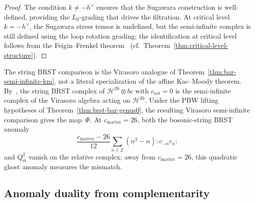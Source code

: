 \begin{proof}
The condition $k \neq -h^\vee$ ensures that the Sugawara
construction is well-defined, providing the $L_0$-grading
that drives the filtration. At critical level
$k = -h^\vee$, the Sugawara stress tensor is undefined, but the
semi-infinite complex is still defined using the loop rotation
grading; the identification at critical level follows from the
Feigin--Frenkel theorem~\cite{Feigin-Frenkel}
(cf.\ Theorem~\ref{thm:critical-level-structure}).
\end{proof}

\begin{remark}
\label{rem:string-brst-special-case}
The string BRST comparison is the Virasoro analogue of
Theorem~\ref{thm:bar-semi-infinite-km}, not a literal specialization
of the affine Kac--Moody theorem. By~\cite{FGZ86}, the string BRST
complex of $\mathcal{H}^{26}\otimes bc$ with $c_{\mathrm{tot}}=0$ is
the semi-infinite complex of the Virasoro algebra acting on
$\mathcal{H}^{26}$. Under the PBW lifting hypotheses of
Theorem~\ref{thm:brst-bar-genus0}, the resulting Virasoro
semi-infinite comparison gives the map~$\Phi$. At
$c_{\mathrm{matter}}=26$, both the bosonic-string BRST anomaly
\[
\frac{c_{\mathrm{matter}}-26}{12}
\sum_{n\in\mathbb Z}(n^3-n){:}c_{-n}c_n{:}
\]
and $Q_{\mathrm{si}}^2$ vanish on the relative complex; away from
$c_{\mathrm{matter}}=26$, this quadratic ghost anomaly measures the
mismatch.
\end{remark}

\subsection{Anomaly duality from complementarity}

